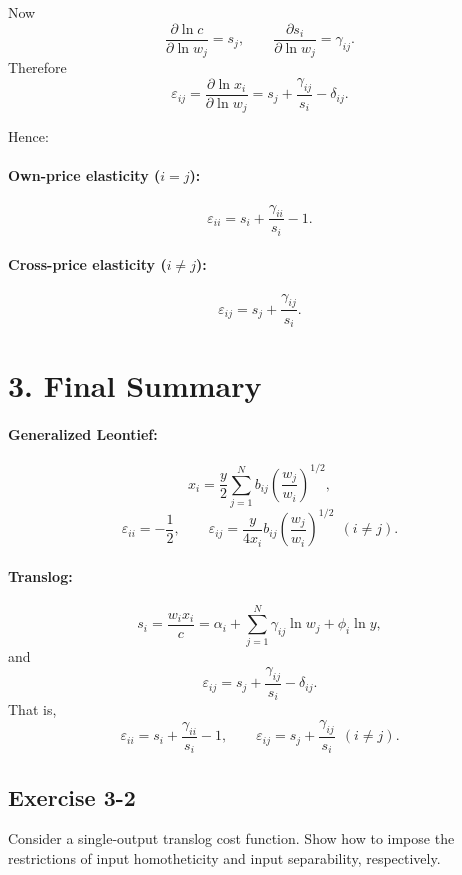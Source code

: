 Now
\[
\frac{\partial \ln c}{\partial \ln w_j}=s_j,
\qquad
\frac{\partial s_i}{\partial \ln w_j}=\gamma_{ij}.
\]
Therefore
\[
\boxed{
\varepsilon_{ij}
=
\frac{\partial \ln x_i}{\partial \ln w_j}
=
s_j+\frac{\gamma_{ij}}{s_i}-\delta_{ij}.
}
\]

Hence:

\paragraph{Own-price elasticity (\(i=j\)):}
\[
\boxed{
\varepsilon_{ii}
=
s_i+\frac{\gamma_{ii}}{s_i}-1.
}
\]

\paragraph{Cross-price elasticity (\(i\neq j\)):}
\[
\boxed{
\varepsilon_{ij}
=
s_j+\frac{\gamma_{ij}}{s_i}.
}
\]

\bigskip
\section*{3. Final Summary}

\paragraph{Generalized Leontief:}
\[
x_i
=
\frac{y}{2}\sum_{j=1}^N b_{ij}\left(\frac{w_j}{w_i}\right)^{1/2},
\]
\[
\boxed{
\varepsilon_{ii}=-\frac{1}{2},
\qquad
\varepsilon_{ij}
=
\frac{y}{4x_i}b_{ij}\left(\frac{w_j}{w_i}\right)^{1/2}
\ \ (i\neq j).
}
\]

\paragraph{Translog:}
\[
s_i=\frac{w_i x_i}{c}
=
\alpha_i+\sum_{j=1}^N \gamma_{ij}\ln w_j+\phi_i\ln y,
\]
and
\[
\boxed{
\varepsilon_{ij}
=
s_j+\frac{\gamma_{ij}}{s_i}-\delta_{ij}.
}
\]
That is,
\[
\boxed{
\varepsilon_{ii}
=
s_i+\frac{\gamma_{ii}}{s_i}-1,
\qquad
\varepsilon_{ij}
=
s_j+\frac{\gamma_{ij}}{s_i}
\ \ (i\neq j).
}
\]


\vspace{30pt}
\begin{tcolorbox}[breakable]

\subsection*{Exercise 3-2}

Consider a single-output translog cost function.
Show how to impose the restrictions of input homotheticity and input separability,
respectively.

\end{tcolorbox}


